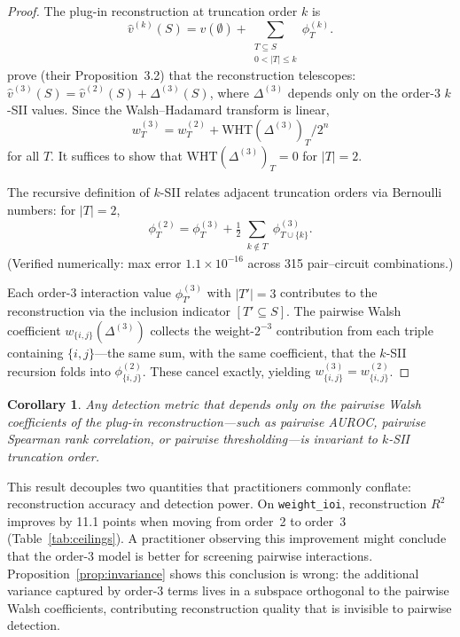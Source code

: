 \documentclass[11pt]{article}
\newtheorem{corollary}{Corollary}
\begin{document}
\begin{proof}
The plug-in reconstruction at truncation order $k$ is
\[
  \hat{v}^{(k)}(S) = v(\emptyset) + \sum_{\substack{T \subseteq S \\ 0 < |T| \leq k}} \phi^{(k)}_T.
\]
\citet{fumagalli2024kernelshapiq} prove (their Proposition~3.2) that
the reconstruction telescopes:
$\hat{v}^{(3)}(S) = \hat{v}^{(2)}(S) + \Delta^{(3)}(S)$,
where $\Delta^{(3)}$ depends only on the order-3 $k$-SII values.
Since the Walsh--Hadamard transform is linear,
\[
  w^{(3)}_T = w^{(2)}_T + \text{WHT}(\Delta^{(3)})_T / 2^n
\]
for all $T$. It suffices to show that
$\text{WHT}(\Delta^{(3)})_T = 0$ for $|T| = 2$.

The recursive definition of $k$-SII
\citep{bordt2023shapley} relates adjacent truncation orders via
Bernoulli numbers: for $|T| = 2$,
\[
  \phi^{(2)}_T = \phi^{(3)}_T + \tfrac{1}{2}
    \sum_{\substack{k \notin T}} \phi^{(3)}_{T \cup \{k\}}.
\]
(Verified numerically: max error $1.1 \times 10^{-16}$ across 315
pair--circuit combinations.)

Each order-3 interaction value $\phi^{(3)}_{T'}$ with $|T'| = 3$
contributes to the reconstruction via the inclusion indicator
$[T' \subseteq S]$. The pairwise Walsh coefficient
$w_{\{i,j\}}(\Delta^{(3)})$ collects the weight-$2^{-3}$ contribution
from each triple containing $\{i,j\}$---the same sum, with the same
coefficient, that the $k$-SII recursion folds into
$\phi^{(2)}_{\{i,j\}}$. These cancel exactly, yielding
$w^{(3)}_{\{i,j\}} = w^{(2)}_{\{i,j\}}$. \qedhere
\end{proof}

\begin{corollary}
Any detection metric that depends only on the pairwise Walsh
coefficients of the plug-in reconstruction---such as pairwise
AUROC, pairwise Spearman rank correlation, or pairwise
thresholding---is invariant to $k$-SII truncation order.
\end{corollary}

This result decouples two quantities that practitioners commonly
conflate: reconstruction accuracy and detection power.
On \texttt{weight\_ioi}, reconstruction $R^2$ improves by 11.1
points when moving from order~2 to order~3
(Table~\ref{tab:ceilings}). A practitioner observing this
improvement might conclude that the order-3 model is better
for screening pairwise interactions. Proposition~\ref{prop:invariance}
shows this conclusion is wrong: the additional variance captured by
order-3 terms lives in a subspace orthogonal to the pairwise Walsh
coefficients, contributing reconstruction quality that is invisible
to pairwise detection.
\end{document}
